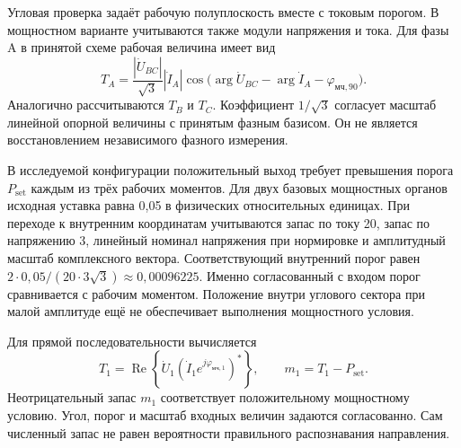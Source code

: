 {}

Угловая проверка задаёт рабочую
полуплоскость вместе с токовым порогом.
В мощностном варианте учитываются
также модули напряжения и тока.
Для фазы A в принятой схеме
рабочая величина имеет вид
\begin{equation}
 T_A=\frac{|\dot{U}_{BC}|}{\sqrt3}
       |\dot{I}_A|
       \cos\bigl(\arg\dot{U}_{BC}
                 -\arg\dot{I}_A
                 -\varphi_{\text{мч},90}\bigr).
 \label{eq:ch5_phase_power}
\end{equation}
Аналогично рассчитываются
$T_B$ и $T_C$.
Коэффициент $1/\sqrt3$ согласует
масштаб линейной опорной величины
с принятым фазным базисом.
Он не является восстановлением
независимого фазного измерения.

В исследуемой конфигурации
положительный выход требует
превышения порога $P_{\mathrm{set}}$
каждым из трёх рабочих моментов.
Для двух базовых мощностных органов
исходная уставка равна 0,05
в физических относительных единицах.
При переходе к внутренним координатам
учитываются запас по току 20,
запас по напряжению 3,
линейный номинал напряжения при нормировке
и амплитудный масштаб комплексного вектора.
Соответствующий внутренний порог равен
$2\cdot0{,}05/(20\cdot3\sqrt3)\approx0{,}00096225$.
Именно согласованный с входом порог
сравнивается с рабочим моментом.
Положение внутри углового сектора
при малой амплитуде ещё
не обеспечивает выполнения
мощностного условия.

{}

Для прямой последовательности
вычисляется
\begin{equation}
 T_1=\operatorname{Re}
 \left\{\dot{U}_1
       \left(\dot{I}_1e^{j\varphi_{\text{мч},1}}\right)^*
 \right\},
 \qquad m_1=T_1-P_{\mathrm{set}}.
 \label{eq:ch5_pos_power}
\end{equation}
Неотрицательный запас $m_1$
соответствует положительному
мощностному условию.
Угол, порог и масштаб входных
величин задаются согласованно.
Сам численный запас
не равен вероятности правильного
распознавания направления.

